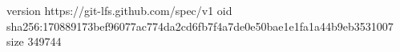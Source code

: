 version https://git-lfs.github.com/spec/v1
oid sha256:170889173bef96077ac774da2cd6fb7f4a7de0e50bae1e1fa1a44b9eb3531007
size 349744
